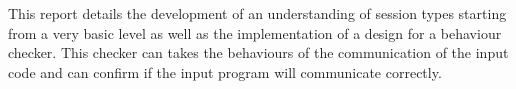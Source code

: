 \begin{thesisabstract}
This report details the development of an understanding of session types starting from a very basic level as well as the implementation of a design for a behaviour checker. This checker can takes the behaviours of the communication of the input code and can confirm if the input program will communicate correctly. 
\end{thesisabstract}